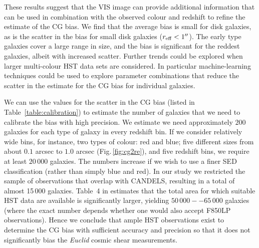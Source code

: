 \documentclass[useAMS,usenatbib]{mnras}
\begin{document}
These results suggest that the VIS image can provide additional information that can be
used in combination with the observed colour and redshift to refine the estimate of the
CG bias.  We find that the average bias is small for disk galaxies, as is the scatter
in the bias for small disk galaxies ($r_{\rm eff}<1''$). The early type galaxies cover
a large range in size, and the bias is significant for the reddest galaxies, albeit with
increased scatter. Further trends could be explored when larger multi-colour HST data sets
are considered. In particular machine-learning techniques could be used to explore
parameter combinations that reduce the scatter in the estimate for the CG bias for individual galaxies.

We can use the values for the scatter in the CG bias (listed in Table~\ref{table:calibration}) to
estimate the number of galaxies that we need to calibrate the bias with high precision. We estimate
we need approximately $200$ galaxies for each type of galaxy in every redshift bin. If we consider
relatively wide bins, for instance, two types of colour: red and blue; five different sizes from
about $0.1$ arcsec to $1.0$ arcsec (Fig.\,\ref{fig:cg2re}), and five redshift bins, we require at least
$20\,000$ galaxies. The numbers increase if we wish to use a finer SED classification (rather than
simply blue and red). In our study we restricted the sample of observations that overlap with CANDELS, resulting in a total of almost 15\,000 galaxies. Table~4 in  estimates that the total area for which suitable HST data are available is significantly larger, yielding $50\,000--65\,000$
galaxies (where the exact number depends whether one would also accept F850LP observations).
Hence we conclude that ample HST observations exist to determine the CG bias with sufficient accuracy and precision so that it does not significantly bias the {\it Euclid} cosmic shear measurements.
\end{document}
